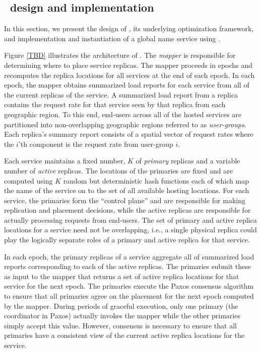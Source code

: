 

\subsection{\auspice\ design and implementation}
\label{sec:design}

In this section, we present the design of \auspice, its underlying optimization framework, and implementation and instantiation of a global name service using \auspice.

Figure \ref{TBD} illustrates the architecture of \auspice. The {\em mapper} is responsible for determining where to place service replicas. The mapper proceeds in epochs and recomputes the replica locations for all services at the end of each epoch. In each epoch, the mapper obtains summarized load reports for each service from all of the current replicas of the service. A summarized load report from a replica contains the request rate for that service seen by that replica from each geographic region. To this end, end-users across all of the hosted services are partitioned into non-overlapping geographic regions referred to as {\em user-groups}. Each replica's summary report consists of a spatial vector of request rates where the $i$'th component is the request rate from user-group $i$.

Each service maintains a fixed number, $K$ of {\em primary} replicas and a variable number of {\em active} replicas. The locations of the primaries are fixed and are computed using $K$ random but deterministic hash functions each of which map the name of the service on to the set of all available hosting locations. For each service, the primaries form the ``control plane'' and are responsible for making replication and placement decisions, while the active replicas are responsible for actually processing requests from end-users.  The set of primary and active replica locations for a service need not be overlapping, i.e., a single physical replica could play the logically separate roles of a primary and active replica for that service.

In each epoch, the primary replicas of a service aggregate all of summarized load reports corresponding to each of the active replicas. The primaries submit these as input to the mapper that returns a set of active replica locations for that service for the next epoch. The primaries execute the Paxos consensus algorithm to ensure that all primaries agree on the placement for the next epoch computed by the mapper. During periods of graceful execution, only one primary (the coordinator in Paxos) actually invokes the mapper while the other primaries simply accept this value. However, consensus is necessary to ensure that all primaries have a consistent view of the current active replica locations for the service. 

